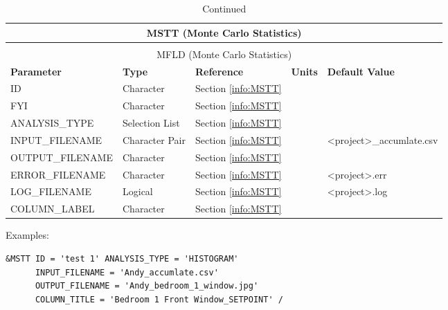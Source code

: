 \noindent
\renewcommand{\tabcolsep}{.1in}
\begin{longtable}{|l|l|l|l|l|}
\caption[Monte Carlo Statistics Plots  ({\ct MSTT} namelist group)]{For more information see Section~\ref{info:MSTT}.}
\label{tbl:MSTT} \\
\hline
\multicolumn{5}{|c|}{{\ct MSTT} (Monte Carlo Statistics)} \\
\hline \hline
\endfirsthead
\caption[]{Continued} \\
\hline
\multicolumn{5}{|c|}{{\ct MFLD} (Monte Carlo Statistics)} \\
\hline \hline
\endhead
\small
\parbox{1.5in}{\bf Parameter}    & \parbox{1in}{\bf Type}  & \parbox{1in}{\bf Reference}  & \parbox{1in}{\bf Units}  & \parbox{1in}{\bf Default Value} \\ \hline
{\ct ID}                         & Character         & Section \ref{info:MSTT}   &      &     \\ \hline
{\ct FYI}                        & Character         & Section \ref{info:MSTT}   &      &     \\ \hline
{\ct ANALYSIS\_TYPE}                       & Selection List    & Section \ref{info:MSTT}   &      &     \\ \hline
{\ct INPUT\_FILENAME}                      & Character Pair    & Section \ref{info:MSTT}   &    & <project>\_accumlate.csv  \\ \hline
{\ct OUTPUT\_FILENAME}              & Character         & Section \ref{info:MSTT}   &      &     \\ \hline
{\ct ERROR\_FILENAME}                   & Character         & Section \ref{info:MSTT}   &    &  <project>.err  \\ \hline
{\ct LOG\_FILENAME}        & Logical           & Section \ref{info:MSTT}   &      & <project>.log    \\ \hline
{\ct COLUMN\_LABEL}   & Character         & Section \ref{info:MSTT}   &      &     \\ \hline

\end{longtable}

\noindent Examples:
\begin{lstlisting}
&MSTT ID = 'test 1' ANALYSIS_TYPE = 'HISTOGRAM' 
      INPUT_FILENAME = 'Andy_accumlate.csv' 
      OUTPUT_FILENAME = 'Andy_bedroom_1_window.jpg'  
      COLUMN_TITLE = 'Bedroom 1 Front Window_SETPOINT' /
\end{lstlisting}



